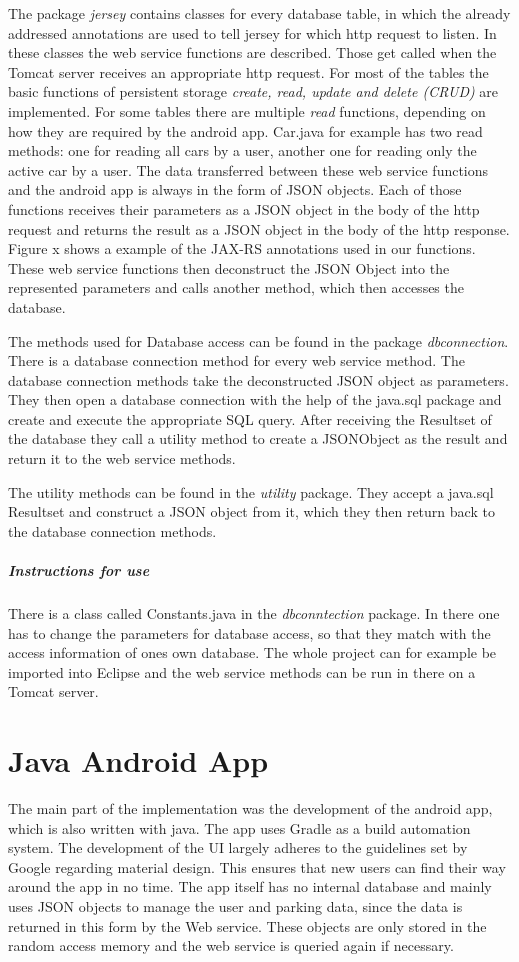 The package \textit{jersey} contains classes for every database table, in which the already addressed annotations are used to tell jersey for which http request to listen. In these classes the web service functions are described. Those get called when the Tomcat server receives an appropriate http request. For most of the tables the basic functions of persistent storage \textit{create, read, update and delete (CRUD)} are implemented. For some tables there are multiple \textit{read} functions, depending on how they are required by the android app. Car.java for example has two read methods: one for reading all cars by a user, another one for reading only the active car by a user. The data transferred between these web service functions and the android app is always in the form of JSON objects. Each of those functions receives their parameters as a JSON object in the body of the http request and returns the result as a JSON object in the body of the http response. Figure x shows a example of the JAX-RS annotations used in our functions. These web service functions then deconstruct the JSON Object into the represented parameters and calls another method, which then accesses the database.

The methods used for Database access can be found in the package \textit{dbconnection}. There is a database connection method for every web service method. The database connection methods take the deconstructed JSON object as parameters. They then open a database connection with the help of the java.sql package and create and execute the appropriate SQL query. After receiving the Resultset of the database they call a utility method to create a JSONObject as the result and return it to the web service methods.

The utility methods can be found in the \textit{utility} package. They accept a java.sql Resultset and construct a JSON object from it, which they then return back to the database connection methods. 

\subparagraph{Instructions for use}
There is a class called Constants.java in the \textit{dbconntection} package. In there one has to change the parameters for database access, so that they match with the access information of ones own database. The whole project can for example be imported into Eclipse and the web service methods can be run in there on a Tomcat server.

\section{Java Android App}
The main part of the implementation was the development of the android app, which is also written with java. The app uses Gradle as a build automation system. The development of the UI largely adheres to the guidelines set by Google regarding material design. This ensures that new users can find their way around the app in no time. The app itself has no internal database and mainly uses JSON objects to manage the user and parking data, since the data is returned in this form by the Web service. These objects are only stored in the random access memory and the web service is queried again if necessary.

